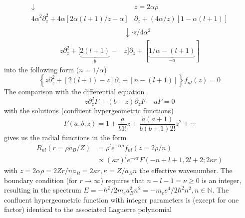 \begin{eqnarray}
\begin{aligned} 
\downarrow & z=2 \alpha \rho \\ 
4 \alpha^{2} \partial_{z}^{2}+4 \alpha[2 \alpha(l+1) / z-\alpha] & \partial_{z}+(4 \alpha / z)[1-\alpha(l+1)] 
\end{aligned}
\end{eqnarray}
\begin{equation}
    \begin{aligned}
        & \downarrow \cdot z / 4 \alpha^{2} \\ 
z \partial_{z}^{2}+[\underbrace{2(l+1)}_{b}-&z] \partial_{z}+[\underbrace{1 / \alpha-(l+1)}_{-a}] 
    \end{aligned}
\end{equation}
into the following form ($n = 1 / \alpha$)
\begin{equation}
    \left\{z \partial_{z}^{2}+[2(l+1)-z] \partial_{z}+[n-(l+1)]\right\} f_{n l}(z)=0
    \end{equation}
The comparison with the differential equation
\begin{equation}
    z \partial_{z}^{2} F+(b-z) \partial_{z} F-a F=0
    \end{equation}
with the solutions (confluent hypergeometric functions)
\begin{equation}
    F(a, b ; z)=1+\frac{a}{b 1 !} z+\frac{a(a+1)}{b(b+1) 2 !} z^{2}+\cdots
    \end{equation}
gives us the radial functions in the form
\begin{equation}
\begin{aligned} R_{n l}\left(r=\rho a_{B} / Z\right) &=\rho^{l} e^{-\alpha \rho} f_{n l}(z=2 \rho / n) \\ & \propto(\kappa r)^{l} e^{-\kappa r} F(-n+l+1,2 l+2 ; 2 \kappa r) \end{aligned}
\end{equation}
with $z = 2\alpha\rho = 2Z r / n a_B = 2\kappa r, \kappa = Z / a_Bn$ the effective wavenumber. The boundary condition (for $r\rightarrow\infty$) requires that $n-l-1 = ν \geq 0$ is an integer, resulting in the spectrum $E = -\hbar^2/2m_ea^2_Bn^2=-m_ee^4/2\hbar^2n^2,n\in\mathbb{N}$. The confluent hypergeometric function with integer parameters is (except for one factor) identical to the associated Laguerre polynomial
